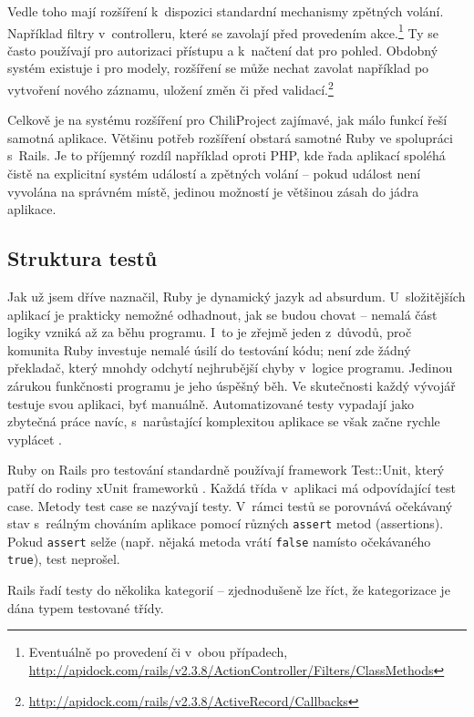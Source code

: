 \documentclass[thesis=B,czech]{FITthesis}[2012/05/02]
\begin{document}
Vedle toho mají rozšíření k~dispozici standardní mechanismy zpětných volání.
Například filtry v~controlleru, které se
zavolají před provedením akce.\footnote{Eventuálně po provedení či v~obou
  případech,
  \url{http://apidock.com/rails/v2.3.8/ActionController/Filters/ClassMethods}} Ty se
často používají pro autorizaci přístupu a k~načtení dat pro
pohled. Obdobný systém existuje i pro modely, rozšíření se může nechat
zavolat například po vytvoření nového záznamu, uložení změn či před
validací.\footnote{\url{http://apidock.com/rails/v2.3.8/ActiveRecord/Callbacks}}

Celkově je na systému rozšíření pro ChiliProject zajímavé, jak málo
funkcí řeší samotná aplikace. Většinu potřeb rozšíření obstará samotné
Ruby ve spolupráci s~Rails. Je to příjemný rozdíl například oproti PHP,
kde řada aplikací spoléhá čistě na explicitní systém událostí
a zpětných volání -- pokud událost není vyvolána na správném místě, jedinou možností je
většinou zásah do jádra aplikace.

\subsection{Struktura testů}
\label{sec:rails_tests}

Jak už jsem dříve naznačil, Ruby je dynamický jazyk ad absurdum.
U~složitějších aplikací je prakticky nemožné odhadnout, jak se budou chovat
-- nemalá část logiky vzniká až za běhu programu. I~to
je zřejmě jeden z~důvodů, proč komunita Ruby investuje nemalé úsilí do
testování kódu; není zde žádný překladač, který mnohdy odchytí nejhrubější chyby
v~logice programu. Jedinou zárukou funkčnosti programu je jeho úspěšný běh.
Ve skutečnosti každý vývojář testuje svou aplikaci, byť manuálně.
Automatizované testy vypadají jako zbytečná práce navíc, s~narůstající
komplexitou aplikace se však začne rychle vyplácet \citep{Rappin2011}.

Ruby on Rails pro testování standardně používají framework Test::Unit,
který patří do rodiny xUnit frameworků \citep{FowlerXunit}. Každá třída
v~aplikaci má odpovídající test case. Metody test case se nazývají
testy. V~rámci testů se porovnává očekávaný stav s~reálným chováním
aplikace pomocí různých \lstinline!assert! metod (assertions). Pokud
\lstinline!assert! selže (např. nějaká metoda vrátí \lstinline!false!
namísto očekávaného \lstinline!true!), test neprošel.

Rails řadí testy do několika kategorií -- zjednodušeně lze říct, že
kategorizace je dána typem testované třídy.
\end{document}
